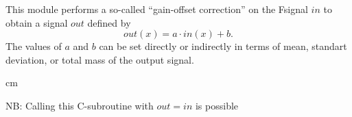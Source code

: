 
This module performs a so-called ``gain-offset correction'' on the Fsignal
$in$ to obtain a signal $out$ defined by 
$$out(x) = a \cdot in(x) + b.$$
The values of $a$ and $b$ can be set directly or indirectly in terms
of mean, standart deviation, or total mass of the output signal.

 cm

NB: Calling this C-subroutine with $out=in$ is possible
